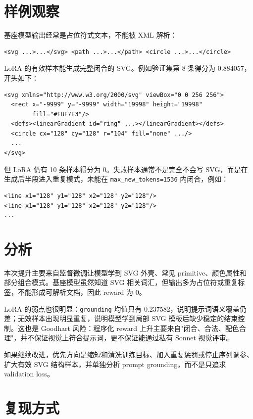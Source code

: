 \documentclass[fontset=none]{ctexart}
\begin{document}
\section{样例观察}

基座模型输出经常是占位符式文本，不能被 XML 解析：

\begingroup\footnotesize
\begin{verbatim}
<svg ...>...</svg> <path ...>...</path> <circle ...>...</circle>
\end{verbatim}
\endgroup

LoRA 的有效样本能生成完整闭合的 SVG。例如验证集第 8 条得分为 0.884057，开头如下：

\begingroup\footnotesize
\begin{verbatim}
<svg xmlns="http://www.w3.org/2000/svg" viewBox="0 0 256 256">
  <rect x="-9999" y="-9999" width="19998" height="19998"
        fill="#FBF7E3"/>
  <defs><linearGradient id="ring" ...></linearGradient></defs>
  <circle cx="128" cy="128" r="104" fill="none" .../>
  ...
</svg>
\end{verbatim}
\endgroup

但 LoRA 仍有 10 条样本得分为 0。失败样本通常不是完全不会写 SVG，而是在生成后半段进入重复模式，未能在 \texttt{max\_new\_tokens=1536} 内闭合，例如：

\begingroup\footnotesize
\begin{verbatim}
<line x1="128" y1="128" x2="128" y2="128"/>
<line x1="128" y1="128" x2="128" y2="128"/>
...
\end{verbatim}
\endgroup

\section{分析}

本次提升主要来自监督微调让模型学到 SVG 外壳、常见 primitive、颜色属性和部分组合模式。基座模型虽然知道 SVG 相关词汇，但输出多为占位符或重复标签，不能形成可解析文档，因此 reward 为 0。

LoRA 的弱点也很明显：\texttt{grounding} 均值只有 0.237582，说明提示词语义覆盖仍差；无效样本出现明显重复，说明模型学到局部 SVG 模板后缺少稳定的结束控制。这也是 Goodhart 风险：程序化 reward 上升主要来自"闭合、合法、配色合理"，并不保证视觉上符合提示词，更不保证能通过私有 Sonnet 视觉评审。

如果继续改进，优先方向是缩短和清洗训练目标、加入重复惩罚或停止序列调参、扩大有效 SVG 结构样本，并单独分析 prompt grounding，而不是只追求 validation loss。

\section{复现方式}
\end{document}
